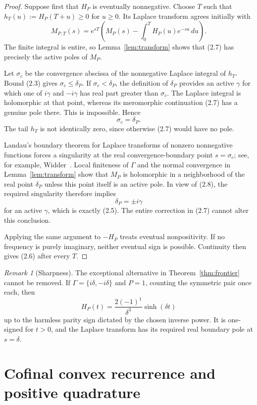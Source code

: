 \documentclass[11pt]{article}
\theoremstyle{remark}
\newtheorem{remark}[theorem]{Remark}
\begin{document}
\begin{proof}
Suppose first that $H_P$ is eventually nonnegative.  Choose $T$ such that
$h_T(u):=H_P(T+u)\geq0$ for $u\geq0$.  Its Laplace transform agrees initially with
\[
 M_{P,T}(s)=e^{sT}\left(
 M_P(s)-\int_0^T H_P(u)e^{-su}\,du\right).
 \tag{2.7}
\]
The finite integral is entire, so Lemma~\ref{lem:transform} shows that (2.7) has precisely the
active poles of $M_P$.

Let $\sigma_c$ be the convergence abscissa of the nonnegative Laplace integral of $h_T$.  Bound
(2.3) gives $\sigma_c\leq\delta_P$.  If $\sigma_c<\delta_P$, the definition of $\delta_P$
provides an active $\gamma$ for which one of $i\gamma$ and $-i\gamma$ has real part greater than
$\sigma_c$.  The Laplace integral is holomorphic at that point, whereas its meromorphic
continuation (2.7) has a genuine pole there.  This is impossible.  Hence
\[
  \sigma_c=\delta_P.
  \tag{2.8}
\]
The tail $h_T$ is not identically zero, since otherwise (2.7) would have no pole.

Landau's boundary theorem for Laplace transforms of nonzero nonnegative functions forces a
singularity at the real convergence-boundary point $s=\sigma_c$; see, for example,
Widder~\cite[Chapter II, Theorem 5b]{Widder1941}.  Local finiteness of $\Gamma$ and the normal
convergence in Lemma~\ref{lem:transform} show that $M_P$ is holomorphic in a neighborhood of the
real point $\delta_P$ unless this point itself is an active pole.  In view of (2.8), the required
singularity therefore implies
\[
 \delta_P=\pm i\gamma
\]
for an active $\gamma$, which is exactly (2.5).  The entire correction in (2.7) cannot alter this
conclusion.

Applying the same argument to $-H_P$ treats eventual nonpositivity.  If no frequency is purely
imaginary, neither eventual sign is possible.  Continuity then gives (2.6) after every $T$.
\end{proof}

\begin{remark}[Sharpness]
The exceptional alternative in Theorem~\ref{thm:frontier} cannot be removed.  If
$\Gamma=\{i\delta,-i\delta\}$ and $P=1$, counting the symmetric pair once each, then
\[
 H_P(t)=\frac{2(-1)^1}{\delta^3}\sinh(\delta t)
\]
up to the harmless parity sign dictated by the chosen inverse power.  It is one-signed for
$t>0$, and the Laplace transform has its required real boundary pole at $s=\delta$.
\end{remark}

\section{Cofinal convex recurrence and positive quadrature}
\label{sec:convex}
\end{document}

